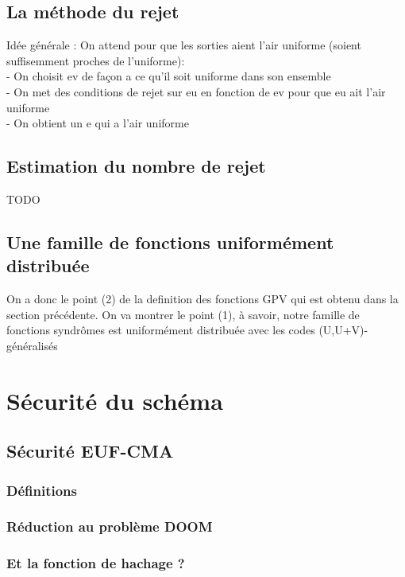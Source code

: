 \documentclass[12pt]{article}
\theoremstyle{definition}
\begin{document}
\subsection{La méthode du rejet}
Idée générale : On attend pour que les sorties aient l'air uniforme (soient suffisemment proches de l'uniforme): \\
- On choisit ev de façon a ce qu'il soit uniforme dans son ensemble \\
- On met des conditions de rejet sur eu en fonction de ev pour que eu ait l'air uniforme \\
- On obtient un e qui a l'air uniforme \\

\subsection{Estimation du nombre de rejet}
TODO \\

\subsection{Une famille de fonctions uniformément distribuée}
On a donc le point (2) de la definition des fonctions GPV qui est obtenu dans la section précédente. On va montrer le point (1), à savoir, notre famille de fonctions syndrômes est uniformément distribuée avec les codes (U,U+V)-généralisés \\

\section{Sécurité du schéma}

\subsection{Sécurité EUF-CMA}
\subsubsection{Définitions}
\subsubsection{Réduction au problème DOOM}
\subsubsection{Et la fonction de hachage ?}
\end{document}
